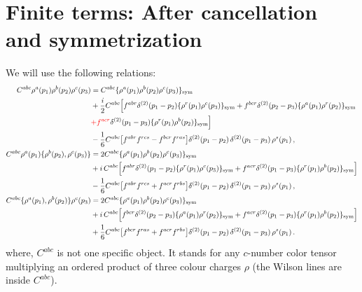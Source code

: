 \documentclass[9pt]{article}
\numberwithin{equation}{section}
\begin{document}
\section{Finite terms: After cancellation and symmetrization}\label{sec:D}
We will use the following relations: 
\begin{align}
C^{abc}\rho^{a}(p_{1})\rho^{b}(p_{2})\rho^{c}(p_{3})&=C^{abc}\{\rho^{a}(p_{1})\rho^{b}(p_{2})\rho^{c}(p_{3})\}_{\rm sym}\notag\\
&+\frac{i}{2}C^{abc}\Big[f^{abr}\delta^{(2)}(p_{1}-p_{2})\{\rho^{r}(p_{1})\rho^{c}(p_{3})\}_{\rm sym}+f^{bcr}\delta^{(2)}(p_{2}-p_{3})\{\rho^{a}(p_{1})\rho^{r}(p_{2})\}_{\rm sym}\notag\\
&{\color{red}+f^{acr}}\delta^{(2)}(p_{1}-p_{3})\{\rho^{r}(p_{1})\rho^{b}(p_{2})\}_{\rm sym}\Big]\notag\\
&-\frac{1}{6}C^{abc}\big[f^{abr}f^{rcs}-f^{bcr}f^{ras}\big]\delta^{(2)}(p_{1}-p_{2})\,\delta^{(2)}(p_{1}-p_{3})\,\rho^{s}(p_{1})\,,\label{eq:D-ord}\\
C^{abc}\rho^{a}(p_{1})\{\rho^{b}(p_{2}),\rho^{c}(p_{3})\}&=2C^{abc}\{\rho^{a}(p_{1})\rho^{b}(p_{2})\rho^{c}(p_{3})\}_{\rm sym}\notag\\
&+i\,C^{abc}\Big[f^{abr}\delta^{(2)}(p_{1}-p_{2})\{\rho^{r}(p_{1})\rho^{c}(p_{3})\}_{\rm sym}+f^{acr}\delta^{(2)}(p_{1}-p_{3})\{\rho^{r}(p_{1})\rho^{b}(p_{2})\}_{\rm sym}\Big]\notag\\
&-\frac{1}{6}C^{abc}\big[f^{abr}f^{rcs}+f^{acr}f^{rbs}\big]\delta^{(2)}(p_{1}-p_{2})\,\delta^{(2)}(p_{1}-p_{3})\,\rho^{s}(p_{1})\,,\label{eq:D-r12}\\
C^{abc}\{\rho^{a}(p_{1}),\rho^{b}(p_{2})\}\rho^{c}(p_{3})&=2C^{abc}\{\rho^{a}(p_{1})\rho^{b}(p_{2})\rho^{c}(p_{3})\}_{\rm sym}\notag\\
&+i\,C^{abc}\Big[f^{bcr}\delta^{(2)}(p_{2}-p_{3})\{\rho^{a}(p_{1})\rho^{r}(p_{2})\}_{\rm sym}+f^{acr}\delta^{(2)}(p_{1}-p_{3})\{\rho^{r}(p_{1})\rho^{b}(p_{2})\}_{\rm sym}\Big]\notag\\
&+\frac{1}{6}C^{abc}\big[f^{bcr}f^{ras}+f^{acr}f^{rbs}\big]\delta^{(2)}(p_{1}-p_{2})\,\delta^{(2)}(p_{1}-p_{3})\,\rho^{s}(p_{1})\,.\label{eq:D-r21}
\end{align}
where, $C^{abc}$ is not one specific object. It stands for any $c$-number color tensor multiplying an ordered product of three {\color{red}colour charges $\rho$ (the Wilson lines are inside $C^{abc}$)}.
\end{document}
